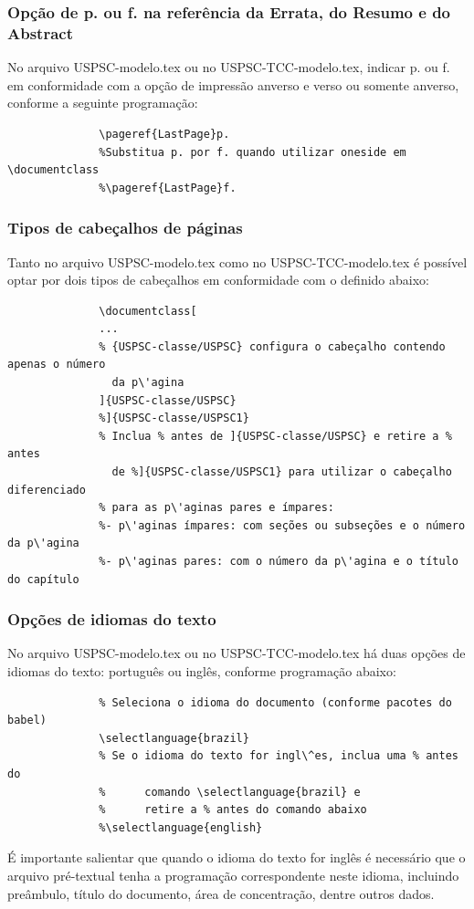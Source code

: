 \subsubsection{Opção de p. ou f. na refer\^encia da Errata, do Resumo e do Abstract} 
 No arquivo USPSC-modelo.tex ou no USPSC-TCC-modelo.tex, indicar p. ou f. em conformidade com a opção de impressão anverso e verso ou somente anverso, conforme a seguinte programação:
			  \begin{verbatim}
			  \pageref{LastPage}p. 
			  %Substitua p. por f. quando utilizar oneside em \documentclass
			  %\pageref{LastPage}f.
			  \end{verbatim}			  
\subsubsection{Tipos de cabeçalhos de p\'aginas} 
Tanto no arquivo USPSC-modelo.tex como no USPSC-TCC-modelo.tex \'e possível optar por dois tipos de cabeçalhos em conformidade com o definido abaixo:
			  \begin{verbatim}
			  \documentclass[
			  ...
			  % {USPSC-classe/USPSC} configura o cabeçalho contendo apenas o número
			    da p\'agina
			  ]{USPSC-classe/USPSC}
			  %]{USPSC-classe/USPSC1}
			  % Inclua % antes de ]{USPSC-classe/USPSC} e retire a % antes 
			    de %]{USPSC-classe/USPSC1} para utilizar o cabeçalho diferenciado
			  % para as p\'aginas pares e ímpares: 
			  %- p\'aginas ímpares: com seções ou subseções e o número da p\'agina
			  %- p\'aginas pares: com o número da p\'agina e o título do capítulo 
			  \end{verbatim}
\subsubsection{Opções de idiomas do texto}\label{idioma} 
No arquivo USPSC-modelo.tex ou no USPSC-TCC-modelo.tex h\'a duas opções de idiomas do texto: portugu\^es ou ingl\^es, conforme programação abaixo:			  
			  \begin{verbatim}
			  % Seleciona o idioma do documento (conforme pacotes do babel)
			  \selectlanguage{brazil}
			  % Se o idioma do texto for ingl\^es, inclua uma % antes do 
			  %      comando \selectlanguage{brazil} e 
			  %      retire a % antes do comando abaixo
			  %\selectlanguage{english}			  
			  \end{verbatim}
É importante salientar que quando o idioma do texto for ingl\^es \'e necess\'ario que o arquivo pr\'e-textual tenha a programação correspondente neste idioma, incluindo pre\^ambulo, título do documento, \'area de concentração, dentre outros dados.
 			  
